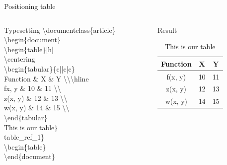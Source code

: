 \documentclass[10pt,xcolor={dvipsnames}]{beamer}
\begin{document}
		\begin{frame}{Positioning table}
				\begin{columns}[T]
					
					\begin{column}{.6 \textwidth}
						\onslide<2->
						\begin{block}{Typesetting}
							\textbackslash documentclass\{{\color{blue}article}\}\\
							
							\textbackslash begin\{{\color{blue}document}\}\\
								\quad\textbackslash begin\{{\color{orange}table}\}{\color{orange}[h]}\\
									\qquad\textbackslash centering\\
									\qquad\textbackslash begin\{{\color{orange}tabular}\}{\color{orange}\{c||c|c\}}\\
										\quad\qquad Function {\color{orange}\&} X {\color{orange}\&} Y {\color{orange}\textbackslash \textbackslash \textbackslash hline} \\
										\quad\qquad f{x, y} {\color{orange}\&} 10 {\color{orange}\&} 11 {\color{orange}\textbackslash \textbackslash}\\
										\quad\qquad z(x, y) {\color{orange}\&} 12 {\color{orange}\&} 13 {\color{orange}\textbackslash \textbackslash}\\
										\quad\qquad w(x, y) {\color{orange}\&} 14 {\color{orange}\&} 15 {\color{orange}\textbackslash \textbackslash}\\
									\qquad\textbackslash end\{{\color{orange}tabular}\}\\
									This is our table{\color{orange}\}}\\
									table\_ref\_1{\color{orange}\}}\\
								\quad\textbackslash begin\{{\color{orange}table}\}\\
								
								
							\textbackslash end\{{\color{blue}document}\}
						\end{block}
					\end{column}
					
					\begin{column}{.4 \textwidth}
						\onslide<3->
						\begin{block}{Result}
							\begin{table}[h]
								\centering
								\begin{tabular}{c||c|c}
									Function & X & Y \\ \hline
									f(x, y) & 10 & 11\\
									z(x, y) & 12 & 13\\
									w(x, y) & 14 & 15 \\
								\end{tabular}
							\caption{This is our table}
							\label{table_ref_1}
							\end{table}
						\end{block}
					\end{column}
					

\end{columns}
\end{frame}
\end{document}
